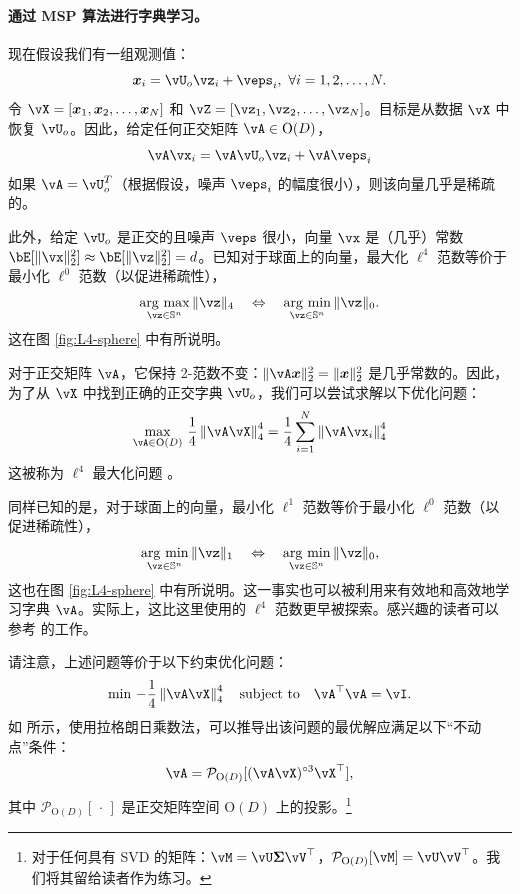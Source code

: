 \documentclass[../../book-main.tex]{subfiles}
\begin{document}
\paragraph{通过 MSP 算法进行字典学习。}

现在假设我们有一组观测值：
\begin{equation}
    \x_i = \vU_o \vz_i + \veps_i,\ \forall i =1, 2, \ldots, N.
\end{equation}
令 $\vX = [\x_1, \x_2, \ldots, \x_N]$ 和 $\vZ = [\vz_1, \vz_2, \ldots, \vz_N]$。目标是从数据 $\vX$ 中恢复 $\vU_o$。因此，给定任何正交矩阵 $\vA \in \mathrm{O}(D)$，$$\vA\vx_i = \vA\vU_o \vz_i + \vA\veps_i$$ 如果 $\vA = \vU_o^T$（根据假设，噪声 $\veps_i$ 的幅度很小），则该向量几乎是稀疏的。

此外，给定 $\vU_o$ 是正交的且噪声 $\veps$ 很小，向量 $\vx$ 是（几乎）常数 $\bE[\norm{\vx}_2^2] \approx \bE[\norm{\vz}_2^2]=d$。已知对于球面上的向量，最大化 $\ell^4$ 范数等价于最小化 $\ell^0$ 范数（以促进稀疏性），
\begin{equation*}
            \argmax_{\vz \in \mathbb{S}^n}\|\vz\|_{4}\quad\Leftrightarrow\quad \argmin_{\vz \in \mathbb{S}^n}\|\vz\|_{0}.
\end{equation*}
这在图 \ref{fig:L4-sphere} 中有所说明。

对于正交矩阵 $\vA$，它保持 2-范数不变：$\|\vA \x\|_2^2 = \|\x\|_2^2$ 是几乎常数的。因此，为了从 $\vX$ 中找到正确的正交字典 $\vU_o$，我们可以尝试求解以下优化问题：
\begin{equation}\label{eq:orthogonal-dictionary-learning-l4}
    \max_{\vA \in \mathrm{O}(D)}\,
     \frac{1}{4} \norm*{
    \vA \vX
    }_4^4 =  \frac{1}{4} \sum_{i=1}^N \norm*{
    \vA \vx_i
    }_4^4
\end{equation}
这被称为 $\ell^4$ 最大化问题 \cite{Zhai-2020}。
\begin{remark}
    同样已知的是，对于球面上的向量，最小化 $\ell^1$ 范数等价于最小化 $\ell^0$ 范数（以促进稀疏性），
\begin{equation*}
            \argmin_{\vz \in \mathbb{S}^n}\|\vz\|_{1}\quad\Leftrightarrow\quad \argmin_{\vz \in \mathbb{S}^n}\|\vz\|_{0},
\end{equation*}
这也在图 \ref{fig:L4-sphere} 中有所说明。这一事实也可以被利用来有效地和高效地学习字典 $\vA$。实际上，这比这里使用的 $\ell^4$ 范数更早被探索。感兴趣的读者可以参考 \cite{qu2020findingsparsestvectorssubspace} 的工作。
\end{remark}

请注意，上述问题等价于以下约束优化问题：
\begin{equation}\label{eq:orthogonal-dictionary-learning-l4}
    \min\,
    -   \frac{1}{4} \norm*{
    \vA \vX
    }_4^4 \quad \mbox{subject to} \quad  \vA^\top\vA = \vI.
\end{equation}
如 \cite{Wright-Ma-2022} 所示，使用拉格朗日乘数法，可以推导出该问题的最优解应满足以下“不动点”条件：
$$
\vA = \mathcal{P}_{\mathrm O(D)}[( {\vA \vX})^{\circ3}\vX^\top],
$$
其中 $\mathcal{P}_{\mathrm O(D)}[\,\cdot\,]$ 是正交矩阵空间 $\mathrm O(D)$ 上的投影。\footnote{对于任何具有 SVD 的矩阵：$\vM = \vU\bm \Sigma \vV^\top$，$\mathcal{P}_{\mathrm O(D)}[\vM] = \vU \vV^\top$。我们将其留给读者作为练习。}
\end{document}
